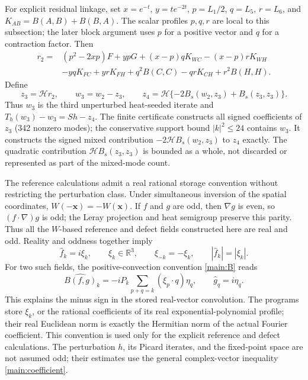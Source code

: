 For explicit residual linkage, set $x=e^{-t}$, $y=te^{-2t}$,
$p=L_1/2$, $q=L_5$, $r=L_6$, and $K_{AB}=B(A,B)+B(B,A)$.
The scalar profiles $p,q,r$ are local to this subsection; the later block
argument uses $p$ for a positive vector and $q$ for a contraction factor.
Then
\begin{align}
 r_2={}&(p^2-2xp)F+ypG+(x-p)qK_{WC}-(x-p)rK_{WH}\nonumber\\
       &-yqK_{FC}+yrK_{FH}+q^2B(C,C)-qrK_{CH}+r^2B(H,H).
       \label{main:r2}
\end{align}
Define
\begin{equation}
 z_3=\mathcal H r_2,\qquad w_3=w_2-z_3,\qquad
 z_4=\mathcal H\{-2B_s(w_2,z_3)+B_s(z_3,z_3)\}.
 \label{main:w3z4}
\end{equation}
Thus $w_3$ is the third unperturbed heat-seeded iterate and
$T_h(w_3)-w_3=Sh-z_4$. The finite certificate constructs all signed
coefficients of $z_3$ (342 nonzero modes); the conservative support bound
$|k|^2\le24$ contains $w_3$. It constructs the signed mixed contribution
$-2\mathcal H B_s(w_2,z_3)$ to $z_4$ exactly. The quadratic contribution
$\mathcal H B_s(z_3,z_3)$ is bounded as a whole, not discarded or represented
as part of the mixed-mode count.

The reference calculations admit a real rational storage convention
without restricting the perturbation class. Under simultaneous inversion
of the spatial coordinates, $W(-\mathbf{x})=-W(\mathbf{x})$. If $f$ and $g$ are odd, then
$\nabla g$ is even, so $(f\cdot\nabla)g$ is odd; the Leray projection
and heat semigroup preserve this parity. Thus all the $W$-based reference
and defect fields constructed here are real and odd. Reality and oddness
together imply
\[
 \widehat f_k=i\xi_k,\qquad \xi_k\in\mathbb R^3,
 \qquad \xi_{-k}=-\xi_k,
 \qquad |\widehat f_k|=|\xi_k|.
\]
For two such fields, the positive-convection convention
\eqref{main:B} reads
\[
 \widehat{B(f,g)}_k
 =-iP_k\sum_{p+q=k}(\xi_p\cdot q)\eta_q,
 \qquad \widehat g_q=i\eta_q.
\]
This explains the minus sign in the stored real-vector convolution.
The programs store $\xi_k$, or the rational coefficients of its real
exponential-polynomial profile; their real Euclidean norm is exactly the
Hermitian norm of the actual Fourier coefficient. This convention is used
only for the explicit reference and defect calculations. The perturbation
$h$, its Picard iterates, and the fixed-point space are not assumed odd;
their estimates use the general complex-vector inequality
\eqref{main:coefficient}.

